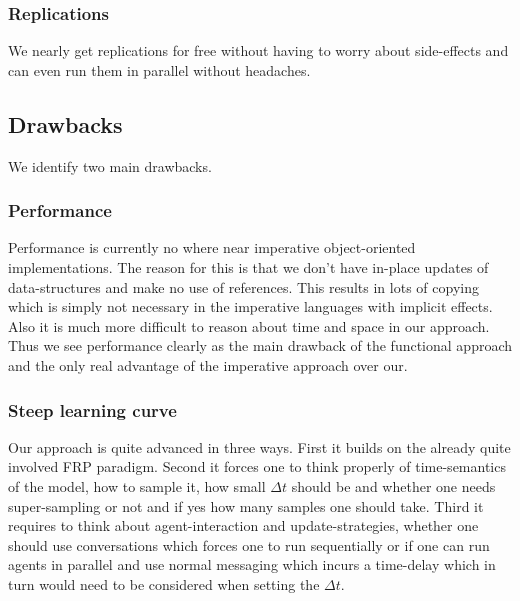 \subsubsection{Replications}
We nearly get replications for free without having to worry about side-effects and can even run them in parallel without headaches.

\subsection{Drawbacks}
We identify two main drawbacks.

\subsubsection{Performance}
Performance is currently no where near imperative object-oriented implementations. The reason for this is that we don't have in-place updates of data-structures and make no use of references. This results in lots of copying which is simply not necessary in the imperative languages with implicit effects. Also it is much more difficult to reason about time and space in our approach. Thus we see performance clearly as the main drawback of the functional approach and the only real advantage of the imperative approach over our.

\subsubsection{Steep learning curve}
Our approach is quite advanced in three ways. First it builds on the already quite involved FRP paradigm. Second it forces one to think properly of time-semantics of the model, how to sample it, how small $\Delta t$ should be and whether one needs super-sampling or not and if yes how many samples one should take. Third it requires to think about agent-interaction and update-strategies, whether one should use conversations which forces one to run sequentially or if one can run agents in parallel and use normal messaging which incurs a time-delay which in turn would need to be considered when setting the $\Delta t$.